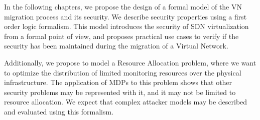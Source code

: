In the following chapters, we propose the design of a formal model of the VN migration process and its security. We describe security properties using a first order logic formalism.
This model introduces the security of SDN virtualization from a formal point of view, and proposes practical use cases to verify if the security has been maintained during the migration of a Virtual Network.

Additionally, we propose to model a Resource Allocation problem, where we want to optimize the distribution of limited monitoring resources over the physical infrastructure.
The application of MDPs to this problem shows that other security problems may be represented with it, and it may not be limited to resource allocation. We expect that complex attacker models may be described and evaluated using this formalism.
